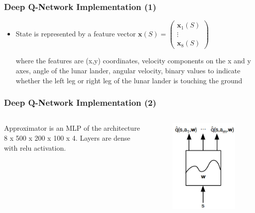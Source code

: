 \documentclass{beamer}
\begin{document}
\begin{frame}
\frametitle{Deep Q-Network Implementation (1)}
\begin{itemize}
	\item State is represented by a feature vector
	$\mathbf{x}(S)=\left(\begin{array}{c}{\mathbf{x}_{1}(S)} \\ {\vdots} \\ {\mathbf{x}_{8}(S)}\end{array}\right)$
	
	
	where the features are (x,y) coordinates, 
	velocity components on the x and y axes,
	angle of the lunar lander, angular
	velocity, binary values to indicate whether the left
	leg or right leg of the lunar lander is touching the ground	
\end{itemize} 
\end{frame}



\begin{frame}
\frametitle{Deep Q-Network Implementation (2)}
\begin{columns}[c] %
	
	Approximator is an MLP of the 
	architecture
	8 x 500 x 200 x 100 x 4. Layers 
	are dense with relu activation. 
	
	\begin{figure}
		\includegraphics[scale=0.5]{nn}
	\end{figure}
	
\end{columns}
\end{frame}
\end{document}
